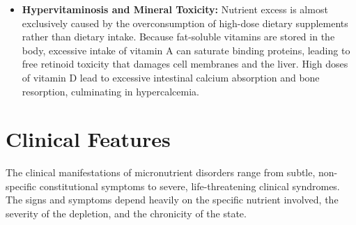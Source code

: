 \begin{itemize}
    \item \textbf{Hypervitaminosis and Mineral Toxicity:} Nutrient excess is almost exclusively caused by the overconsumption of high-dose dietary supplements rather than dietary intake. Because fat-soluble vitamins are stored in the body, excessive intake of vitamin A can saturate binding proteins, leading to free retinoid toxicity that damages cell membranes and the liver. High doses of vitamin D lead to excessive intestinal calcium absorption and bone resorption, culminating in hypercalcemia.
\end{itemize}

\section*{Clinical Features}
The clinical manifestations of micronutrient disorders range from subtle, non-specific constitutional symptoms to severe, life-threatening clinical syndromes. The signs and symptoms depend heavily on the specific nutrient involved, the severity of the depletion, and the chronicity of the state.

